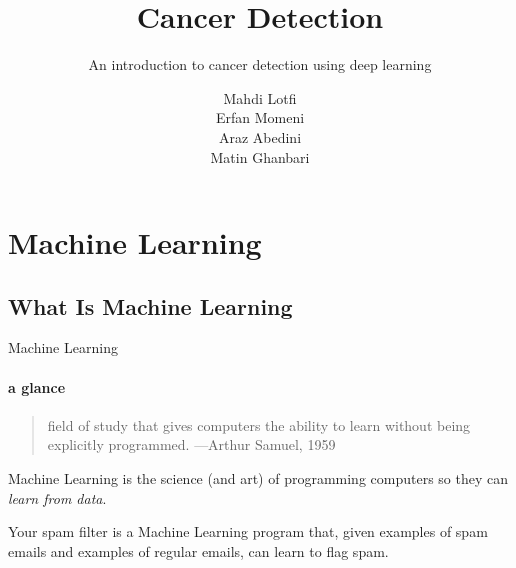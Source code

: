 \documentclass{beamer}
\title{Cancer Detection} %
\subtitle{An introduction to cancer detection using deep learning} %
\author{Mahdi Lotfi \\ Erfan Momeni \\ Araz Abedini \\ Matin Ghanbari}
\begin{document}
  \frame[c]{\maketitle}

    \section{Machine Learning}
    \subsection{What Is Machine Learning}
    \begin{frame}[t]{Machine Learning}
      \framesubtitle{a glance}%
      \begin{quote}
        field of study that gives computers the ability to learn without being explicitly programmed.
        \hfill {\tiny —Arthur Samuel, 1959}
      \end{quote}
      Machine Learning is the science (and art) of programming computers so they can \textit{learn from data}. \\
      \vspace{8mm}
      \parbox{0.55\textwidth}{
      Your spam filter is a Machine Learning program that, given examples of spam emails and examples of regular emails, can learn to flag spam.
      }
    \end{frame}
\end{document}
